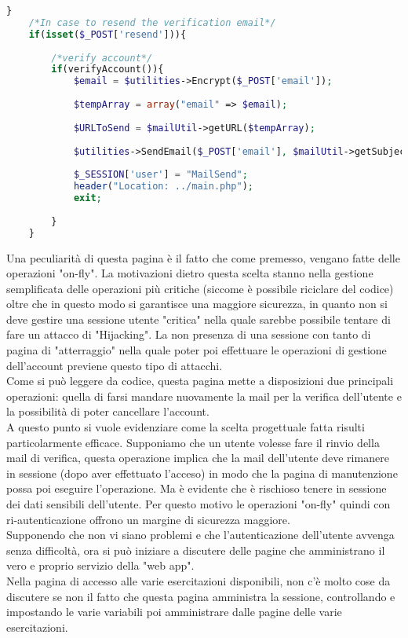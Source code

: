 \begin{lstlisting}[language=php]
	}
	/*In case to resend the verification email*/
	if(isset($_POST['resend'])){
		
		/*verify account*/
		if(verifyAccount()){
			$email = $utilities->Encrypt($_POST['email']);
			
			$tempArray = array("email" => $email);
			
			$URLToSend = $mailUtil->getURL($tempArray);
			
			$utilities->SendEmail($_POST['email'], $mailUtil->getSubject(), $mailUtil->getBody($URLToSend), $mailUtil->getAlternativeBody($URLToSend));
			
			$_SESSION['user'] = "MailSend";
			header("Location: ../main.php");
			exit;
			
		}
	}
\end{lstlisting}

Una peculiarità di questa pagina è il fatto che come premesso, vengano fatte delle operazioni "on-fly". La motivazioni dietro questa scelta stanno nella gestione semplificata delle operazioni più critiche (siccome è possibile riciclare del codice) oltre che in questo modo si garantisce una maggiore sicurezza, in quanto non si deve gestire una sessione utente "critica" nella quale sarebbe possibile tentare di fare un attacco di "Hijacking". La non presenza di una sessione con tanto di pagina di "atterraggio" nella quale poter poi effettuare le operazioni di gestione dell'account previene questo tipo di attacchi.\\
Come si può leggere da codice, questa pagina mette a disposizioni due principali operazioni: quella di farsi mandare nuovamente la mail per la verifica dell'utente e la possibilità di poter cancellare l'account.\\
A questo punto si vuole evidenziare come la scelta progettuale fatta risulti particolarmente efficace. Supponiamo che un utente volesse fare il rinvio della mail di verifica, questa operazione implica che la mail dell'utente deve rimanere in sessione (dopo aver effettuato l'acceso) in modo che la pagina di manutenzione possa poi eseguire l'operazione. Ma è evidente che è rischioso tenere in sessione dei dati sensibili dell'utente. Per questo motivo le operazioni "on-fly" quindi con ri-autenticazione offrono un margine di sicurezza maggiore.\\

Supponendo che non vi siano problemi e che l'autenticazione dell'utente avvenga senza difficoltà, ora si può iniziare a discutere delle pagine che amministrano il vero e proprio servizio della "web app".\\
Nella pagina di accesso alle varie esercitazioni disponibili, non c'è molto cose da discutere se non il fatto che questa pagina amministra la sessione, controllando e impostando le varie variabili poi amministrare dalle pagine delle varie esercitazioni. 

